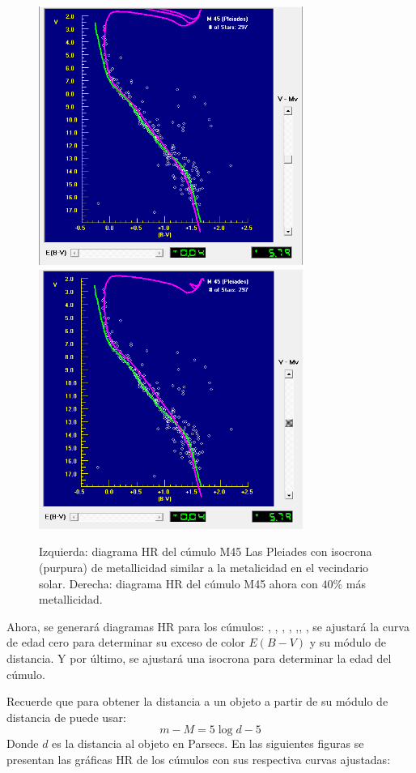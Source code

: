 \documentclass[12pt]{article}
\begin{document}
\begin{figure}[H]
    \includegraphics[width= 3.40in]{plea2.png}
    \includegraphics[width= 3.40in]{plea3.png}
  \caption{Izquierda: diagrama HR del cúmulo M45 Las Pleiades con isocrona (purpura) de metallicidad similar a la metalicidad en el vecindario solar. Derecha: diagrama HR del cúmulo M45 ahora con $40\%$ más metallicidad.}
  \label{hrmetal}
\end{figure}

Ahora, se generará diagramas HR para los cúmulos: , , , , ,,  , se ajustará la curva de edad cero para determinar su exceso de color $E(B-V)$ y su módulo de distancia. Y por último, se ajustará una isocrona para determinar la edad del cúmulo. 

Recuerde que para obtener la distancia a un objeto a partir de su módulo de distancia de puede usar:
\begin{equation}
m- M = 5\log{d} - 5    
\end{equation}
Donde $d$ es la distancia al objeto en Parsecs.
En las siguientes figuras se presentan las gráficas HR de los cúmulos con sus respectiva curvas ajustadas:
\newpage
\end{document}
